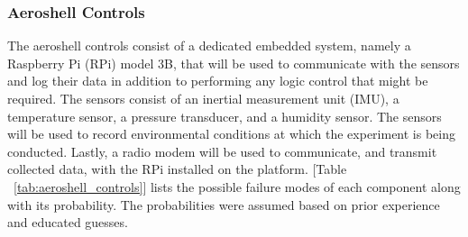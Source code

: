 
\subsubsection{\label{sss:aeroshell_controls} Aeroshell Controls}

\indent\indent The aeroshell controls consist of a dedicated embedded system, namely a Raspberry Pi (RPi) model 3B, that will be used to communicate with the sensors and log their data in addition to performing any logic control that might be required. The sensors consist of an inertial measurement unit (IMU), a temperature sensor, a pressure transducer, and a humidity sensor. The sensors will be used to record environmental conditions at which the experiment is being conducted. Lastly, a radio modem will be used to communicate, and transmit collected data, with the RPi installed on the platform. [Table ~\ref{tab:aeroshell_controls}] lists the possible failure modes of each component along with its probability. The probabilities were assumed based on prior experience and educated guesses.

